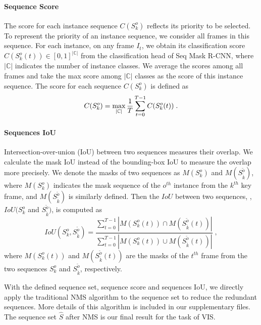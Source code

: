 \documentclass[10pt,twocolumn,letterpaper]{article}
\begin{document}
	\paragraph{Sequence Score}
	The score for each instance sequence $C(S_k^o)$ reflects its priority to be selected. 
	To represent the priority of an instance sequence, we consider all frames in this sequence. For each instance, on any frame $I_t$, we obtain its classification score $C(S_k^o(t)) \in [0,1]^{|\mathbb{C}|}$ from the classification head of Seq Mask R-CNN, where $|\mathbb{C}|$ indicates the number of instance classes. We average the scores among all frames and take the max score among $|\mathbb{C}|$ classes as the score of this instance sequence. The score for each sequence $C(S_k^o)$ is defined as 
	\begin{equation}\label{eq:seq_score}
	C(S_k^o) = \max_{|\mathbb{C}|} \frac{1}{T} \sum_{t=0}^{T-1} {C(S_k^o(t))} \;.
	\vspace{-0.1in}
	\end{equation}
	
	\vspace{-0.1in}
	\paragraph{Sequences IoU}
	Intersection-over-union (IoU) between two sequences measures their overlap. 
	We calculate the mask IoU instead of the bounding-box IoU to measure the overlap more precisely.
	We denote the masks of two sequences as $M(S_k^o)$ and $M(S_{\tilde{k}}^{\tilde{o}})$, where $M(S_k^o)$ indicates the mask sequence of the $o^{th}$ instance from the $k^{th}$ key frame, and $M(S_{\tilde{k}}^{\tilde{o}})$ is similarly defined.
Then the $IoU$ between two sequences, \ie, $IoU(S_{k}^{o}$ and $S_{\tilde{k}}^{\tilde{o}})$, is computed as
	\begin{equation}\label{eq:seq_iou}
	IoU(S_{k}^{o}, S_{\tilde{k}}^{\tilde{o}}) = \frac{\sum_{t = 0}^{T-1} | M(S_k^o(t)) \cap M(S_{\tilde{k}}^{\tilde{o}}(t)) |}{\sum_{t = 0}^{T-1} | M(S_k^o(t)) \cup M(S_{\tilde{k}}^{\tilde{o}}(t)) |} \;,
	\end{equation}
	where $M(S_k^o(t))$ and $M(S_{\tilde{k}}^{\tilde{o}}(t))$ are the masks of the $t^{th}$ frame from the two sequences $S_k^o$ and $S_{\tilde{k}}^{\tilde{o}}$, respectively.
	
	With the defined sequence set, sequence score and sequences IoU, we directly apply the traditional NMS algorithm to the sequence set to reduce the redundant sequences. 
	More details of this algorithm is included in our supplementary files. 
	The sequence set $\widehat{S}$ after NMS is our final result for the task of VIS.
	
\end{document}
